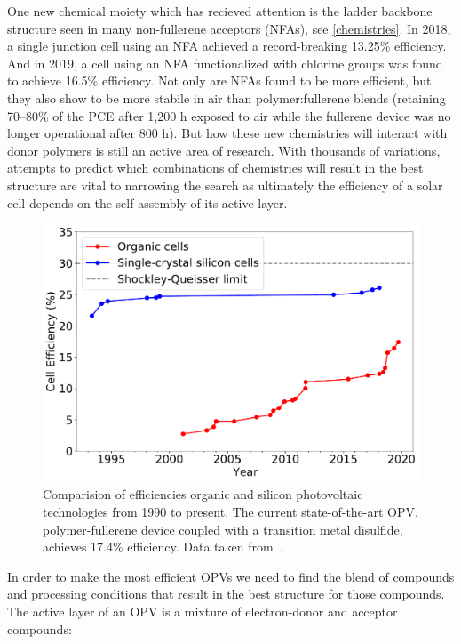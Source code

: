 One new chemical moiety which has recieved attention is the ladder backbone structure seen in many non-fullerene acceptors (NFAs), see \autoref{chemistries}.
In 2018, a single junction cell using an NFA achieved a record-breaking 13.25\% efficiency\cite{raynergy}.
And in 2019, a cell using an NFA functionalized with chlorine groups was found to achieve 16.5\% efficiency\cite{Cui2019}. 
Not only are NFAs found to be more efficient, but they also show to be more stabile in air than polymer:fullerene blends (retaining 70--80\% of the PCE after 1,200 h exposed to air while the fullerene device was no longer operational after 800 h)\cite{Baran2017}.
But how these new chemistries will interact with donor polymers is still an active area of research.
With thousands of variations, attempts to predict which combinations of chemistries will result in the best structure are vital to narrowing the search\cite{Gao2020} as ultimately the efficiency of a solar cell depends on the self-assembly of its active layer. 

\begin{figure}[h!]
    \centering
    \includegraphics[width=0.8\linewidth]{images/NREL2020.pdf}
    \caption{Comparision of efficiencies organic and silicon photovoltaic technologies from 1990 to present. The current state-of-the-art OPV, polymer-fullerene device coupled with a transition metal disulfide, achieves 17.4\% efficiency\cite{Lin2019}. Data taken from~\cite{NREL2020}.}\label{nrel}
\end{figure}

In order to make the most efficient OPVs we need to find the blend of compounds and processing conditions that result in the best structure for those compounds.
The active layer of an OPV is a mixture of electron-donor and acceptor compounds: 

